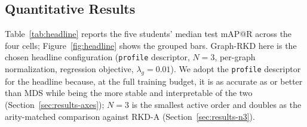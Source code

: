 \documentclass[11pt,letterpaper]{article}
\begin{document}
\subsection{Quantitative Results}
\label{sec:results-quant}

%
%
%
Table~\ref{tab:headline} reports the five students' median test mAP@R across the four
cells; Figure~\ref{fig:headline} shows the grouped bars. Graph-RKD here is the chosen
headline configuration (\texttt{profile} descriptor, $N{=}3$, per-graph normalization,
regression objective, $\lambda_g{=}0.01$). We adopt the \texttt{profile} descriptor for
the headline because, at the full training budget, it is as accurate as or better than
MDS while being the more stable and interpretable of the two
(Section~\ref{sec:results-axes}); $N{=}3$ is the smallest active order and doubles as the
arity-matched comparison against RKD-A (Section~\ref{sec:results-n3}).
\end{document}
